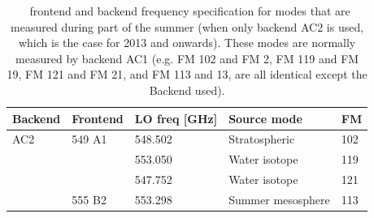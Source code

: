 \begin{table}
\caption{ \smr\ frontend and backend frequency specification for modes that are measured 
during part of the summer (when only backend AC2 is used, which is the case for 2013 and onwards). 
These modes are normally measured by backend AC1 (e.g. FM 102 and FM 2, FM 119 and FM 19, 
FM 121 and FM 21, and FM 113 and 13, are all identical except the Backend used).}
\label{table:config3}
\begin{tabular}{|l|l|l|l|l|}
  \hline
  \textbf{Backend} & \textbf{Frontend} & \textbf{LO freq {[}GHz{]}} & \textbf{Source mode} & \textbf{FM} \\
  \hline
  AC2              & 549 A1            & 548.502                    & Stratospheric        &  102 \\
  \cline{3-3}
  \cline{4-4}
  \cline{5-5}
                   &                   & 553.050                    & Water isotope        & 119 \\
  \cline{3-3}
  \cline{4-4}
  \cline{5-5}
                   &                   & 547.752                    & Water isotope        & 121 \\
  \cline{2-2}
  \cline{3-3}
  \cline{4-4}
  \cline{5-5}
                   & 555 B2            & 553.298                    & Summer mesosphere    & 113 \\
  \hline
\end{tabular}
\end{table}




